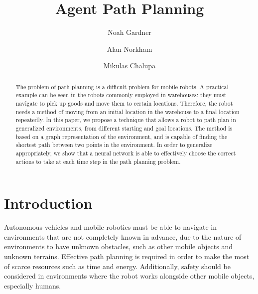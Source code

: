 \documentclass[sigplan,screen]{acmart}
\begin{document}
\title{Agent Path Planning}
\author{Noah Gardner}

\author{Alan Norkham}

\author{Mikulas Chalupa}
\renewcommand{\shortauthors}{Gardner et al.}

\begin{abstract}
    The problem of path planning is a difficult problem for mobile robots. A
    practical example can be seen in the robots commonly employed in warehouses:
    they must navigate to pick up goods and move them to certain locations.
    Therefore, the robot needs a method of moving from an initial location in
    the warehouse to a final location repeatedly. In this paper, we propose a
    technique that allows a robot to path plan in generalized environments, from
    different starting and goal locations. The method is based on a graph
    representation of the environment, and is capable of finding the shortest
    path between two points in the environment. In order to generalize
    appropriately, we show that a neural network is able to effectively choose
    the correct actions to take at each time step in the path planning problem.
\end{abstract}
\maketitle

\section{Introduction}
Autonomous vehicles and mobile robotics must be able to navigate in environments
that are not completely known in advance, due to the nature of environments to
have unknown obstacles, such as other mobile objects and unknown terrains.
Effective path planning is required in order to make the most of scarce
resources such as time and energy. Additionally, safety should be considered in
environments where the robot works alongside other mobile objects, especially
humans.
\end{document}
